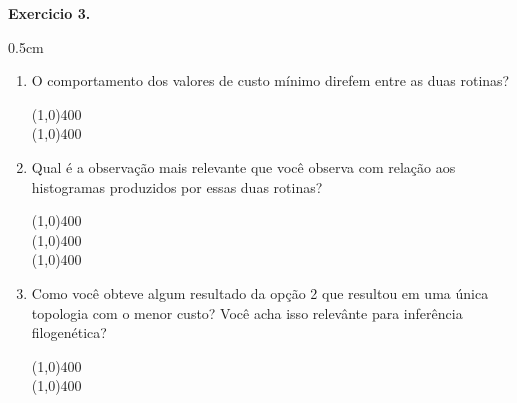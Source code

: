 \begin{refsection}
\begin{blackBlock}{\textbf{Exercicio 3.}}
\begin {myindentpar}{0.5cm}
\begin{enumerate}[\itshape i.]
 \item{O comportamento dos valores de custo mínimo direfem entre as duas rotinas?}\\
  \begin{center}
  \line(1,0){400}\\
  \line(1,0){400}\\
  \end{center}

 \item{Qual é a observação mais relevante que você observa com relação aos histogramas produzidos por essas duas rotinas?}\\
  \begin{center}
  \line(1,0){400}\\
  \line(1,0){400}\\
  \line(1,0){400}\\
  \end{center}

 \item{Como você obteve algum resultado da opção 2 que resultou em uma única topologia com o menor custo? Você acha isso relevânte para inferência filogenética?}\\
  \begin{center}
  \line(1,0){400}\\
  \line(1,0){400}\\
  \end{center}

\end{enumerate}
\end{myindentpar}

\end{blackBlock}



\vspace{20pt}


\end{refsection}
